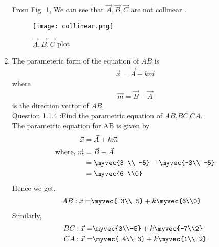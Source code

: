 \documentclass[11pt]{book}
\begin{document}
\begin{enumerate}[label=\thesection.\arabic*.,ref=\thesection.\theenumi]
From Fig. \ref{fig1:Triangle}, We can see that $\vec{A},\vec{B},\vec{C}$ are not collinear .
\begin{figure}[h]
\centering
\texttt{[image: collinear.png]}
\caption{$\vec{A},\vec{B},\vec{C}$ plot}
\label{fig1:Triangle}
\end{figure}



\item The parameteric form of the equation  of $AB$ is 
		\begin{align}
			\vec{x}=\vec{A}+k\vec{m}
		\end{align}
		where
		\begin{align}
\vec{m}=\vec{B}-\vec{A}
		\end{align}
is the direction vector of $AB$.\\
Question 1.1.4 :Find the parametric equation of $AB$,$BC$,$CA$.\\
\solution
The parametric equation for AB is given by
\begin{align}
\vec{x} &= \vec{A} + k\vec{m}\\
\text{where, } \vec{m} &= \vec{B} -\vec{A}\\
&= \myvec{3 \\ -5} -\myvec{-3\\ -5}\\
&= \myvec{6 \\0}
\end{align}
Hence we get,
\begin{align}
AB: \vec{x} = &\myvec{-3\\-5} + k \myvec{6\\0}
\end{align}
Similarly, 
\begin{align}
BC: \vec{x} = &\myvec{3\\-5} + k \myvec{-7\\2}\\
CA: \vec{x} = &\myvec{-4\\-3} + k \myvec{1\\-2}
\end{align}



\end{enumerate}
\end{document}
